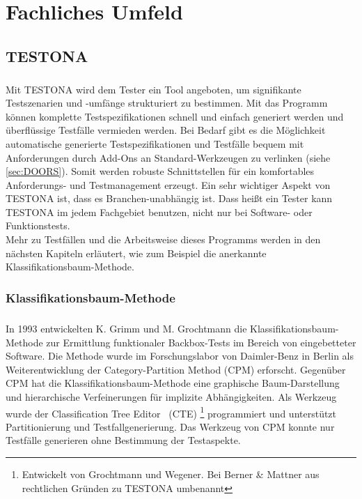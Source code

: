 \chapter{Fachliches Umfeld}\label{chp:fachlichesumfeld}

\section{TESTONA}\label{sec:Testona} 
\paragraph{}

Mit TESTONA wird dem Tester ein Tool angeboten, um signifikante Testszenarien und -umfänge strukturiert zu bestimmen. Mit das Programm können komplette Testspezifikationen schnell und einfach generiert werden und überflüssige Testfälle vermieden werden. Bei Bedarf gibt es die Möglichkeit automatische generierte Testspezifikationen und Testfälle bequem mit Anforderungen durch Add-Ons an Standard-Werkzeugen zu verlinken (siehe \ref{sec:DOORS}). Somit werden robuste Schnittstellen für ein komfortables Anforderungs- und Testmanagement erzeugt. Ein sehr wichtiger Aspekt von TESTONA ist, dass es Branchen-unabhängig ist. Dass heißt ein Tester kann TESTONA im jedem Fachgebiet benutzen, nicht nur bei Software- oder Funktionstests.\\

Mehr zu Testfällen und die Arbeitsweise dieses Programms werden in den nächsten Kapiteln erläutert, wie zum Beispiel die anerkannte Klassifikationsbaum-Methode.



\subsection{Klassifikationsbaum-Methode}\label{ssec:KM}
\paragraph{}
In 1993 entwickelten K. Grimm und M. Grochtmann die Klassifikationsbaum-Methode zur Ermittlung funktionaler Backbox-Tests im Bereich von eingebetteter Software. Die Methode wurde im Forschungslabor von Daimler-Benz in Berlin als Weiterentwicklung der Category-Partition Method (CPM) erforscht. Gegenüber CPM hat die Klassifikationsbaum-Methode eine graphische Baum-Darstellung und hierarchische Verfeinerungen für implizite Abhängigkeiten. Als Werkzeug wurde der \glqq Classification Tree Editor\grqq~ (CTE) \footnote{Entwickelt von Grochtmann und Wegener\cite{TestCaseDesign}. Bei Berner  \& Mattner aus rechtlichen Gründen zu TESTONA umbenannt} programmiert und unterstützt Partitionierung und Testfallgenerierung. Das Werkzeug von CPM konnte nur Testfälle generieren ohne Bestimmung der Testaspekte\cite{ClassificationTrees}.

